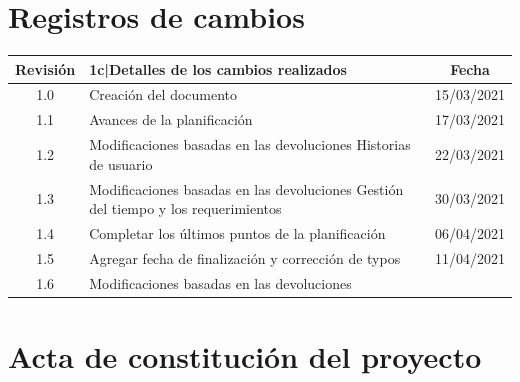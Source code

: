\documentclass[11pt]{charter}
\begin{document}
\maketitle
\thispagestyle{empty}
\pagebreak


\thispagestyle{empty}
{\setlength{\parskip}{0pt}
\tableofcontents{}
}
\pagebreak


\section{Registros de cambios}
\label{sec:registro}


\begin{table}[ht]
\label{tab:registro}
\centering
\begin{tabularx}{\linewidth}{@{}|c|X|c|@{}}
\hline
\rowcolor[HTML]{C0C0C0} 
Revisión & {1}{c|}{\cellcolor[HTML]{C0C0C0}Detalles de los cambios realizados} & Fecha      \\ \hline
1.0      & Creación del documento                                          & 15/03/2021 \\ \hline
1.1      & Avances de la planificación & 17/03/2021 \\ \hline
1.2      & Modificaciones basadas en las devoluciones \newline
		   Historias de usuario											   & 22/03/2021 \\ \hline
1.3      & Modificaciones basadas en las devoluciones \newline
		   Gestión del tiempo y los requerimientos								   & 30/03/2021 \\ \hline
1.4      & Completar los últimos puntos de la planificación & 06/04/2021 \\ \hline
1.5      & Agregar fecha de finalización y corrección de typos & 11/04/2021 \\ \hline
1.6      & Modificaciones basadas en las devoluciones\\ \hline
\end{tabularx}
\end{table}

\pagebreak



\section{Acta de constitución del proyecto}
\label{sec:acta}
\end{document}
